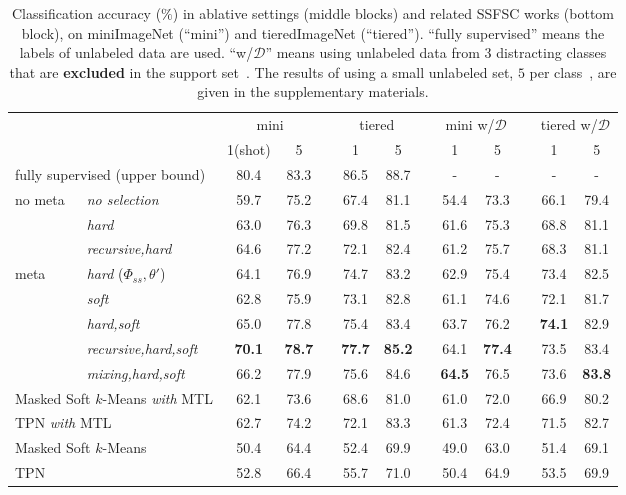 \documentclass{article}
\begin{document}
 \begin{table*}[t]
\centering
\small
\begin{tabular}{llccccccccccc}
\toprule 
&& \multicolumn{2}{c}{mini}
&& \multicolumn{2}{c}{tiered} && \multicolumn{2}{c}{mini w/$\mathcal{D}$}
&& \multicolumn{2}{c}{tiered w/$\mathcal{D}$} \\
\cmidrule{3-4}\cmidrule{6-7} \cmidrule{9-10}\cmidrule{12-13}
&& 1(shot) & 5 && 1 & 5 && 1 & 5 && 1 & 5 \\
\midrule[1pt]
\multicolumn{2}{l}{fully supervised (upper bound)} & 80.4 & 83.3 && 86.5 & 88.7  && - & -  && - & -  \\
\midrule[1pt]
\multirow{3}{*}{no meta}& \emph{no selection} & 59.7 & 75.2  && 67.4 & 81.1  && 54.4 & 73.3  && 66.1 & 79.4  \\
&
\emph{hard} & 63.0 & 76.3  && 69.8 & 81.5 && 61.6 & 75.3  && 68.8 & 81.1  \\
&\emph{recursive,hard} & 64.6 & 77.2 && 72.1 & 82.4  && 61.2 & 75.7  && 68.3 & 81.1  \\
\midrule[1pt]
\multirow{5}{*}{meta}&
\emph{hard} ($\Phi_{ss}, \theta'$) & 64.1 & 76.9  && 74.7 & 83.2  && 62.9 & 75.4  && 73.4 & 82.5  \\
&\emph{soft} & 62.8 & 75.9  && 73.1 & 82.8  && 61.1 & 74.6  && 72.1 & 81.7  \\
&\emph{hard,soft} & 65.0 & 77.8  && 75.4 & 83.4  && 63.7 & 76.2  && \textbf{74.1} & 82.9  \\
&\emph{recursive,hard,soft} & \textbf{70.1} & \textbf{78.7}  && \textbf{77.7} & \textbf{85.2}  && 64.1 & \textbf{77.4}  && 73.5 & 83.4  \\
&\emph{mixing,hard,soft} & 66.2 & 77.9  && 75.6 & 84.6  && \textbf{64.5} & 76.5  && 73.6 & \textbf{83.8}  \\
\midrule[1pt]
\multicolumn{2}{l}{Masked Soft $k$-Means \emph{with} MTL} & 62.1 & 73.6  && 68.6 & 81.0 && 61.0 & 72.0 && 66.9 & 80.2  \\
\multicolumn{2}{l}{TPN \emph{with} MTL} & 62.7 & 74.2  && 72.1 & 83.3  && 61.3 & 72.4 && 71.5 & 82.7  \\
\multicolumn{2}{l}{Masked Soft $k$-Means~\cite{RenICLR2018_semisupervised}} & 50.4 & 64.4  && 52.4 & 69.9 && 49.0 & 63.0 && 51.4 & 69.1  \\
\multicolumn{2}{l}{TPN~\cite{LiuICLR2019transductive}} & 52.8 & 66.4  && 55.7 &  71.0 && 50.4 &  64.9 && 53.5 & 69.9  \\
\bottomrule[1pt]
\end{tabular}
\caption{Classification accuracy ($\%$) in ablative settings (middle blocks) and related SSFSC works (bottom block), on miniImageNet (``mini'') and tieredImageNet (``tiered'').
``fully supervised'' means the labels of unlabeled data are used. ``w/$\mathcal{D}$'' means using unlabeled data from $3$ distracting classes that are \textbf{excluded} in the support set~\cite{LiuICLR2019transductive, RenICLR2018_semisupervised}. 
The results of using a small unlabeled set, $5$ per class~\cite{RenICLR2018_semisupervised}, are given in the supplementary materials.}
\label{table_ablation}
 \vspace{-0.2cm}
\end{table*} 
\end{document}
